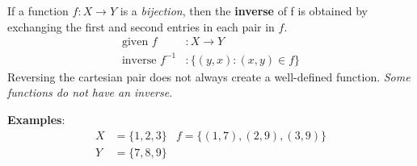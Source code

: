 If a function $f: X \rightarrow Y$ is a \textit{bijection},
then the \textbf{inverse} of f is obtained by exchanging the first and second entries in each pair in $f$.
\begin{align*}
  \text{given } f        & : X \rightarrow Y           \\
  \text{inverse } f^{-1} & : \{(y, x) : (x, y) \in f\}
\end{align*}
Reversing the cartesian pair does not always create a well-defined function.
\textit{Some functions do not have an inverse}.

\textbf{Examples}:
\begin{align*}
  X & = \{1, 2, 3\} & f = \{(1, 7), (2, 9), (3, 9)\} \\
  Y & = \{7, 8, 9\}
\end{align*}

